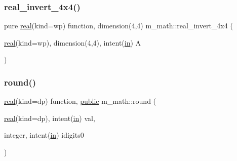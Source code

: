 \subsubsection{\texorpdfstring{real\+\_\+invert\+\_\+4x4()}{real\_invert\_4x4()}}
{\footnotesize\ttfamily pure \hyperlink{read__watch_83_8txt_abdb62bde002f38ef75f810d3a905a823}{real}(kind=wp) function, dimension(4,4) m\+\_\+math\+::real\+\_\+invert\+\_\+4x4 (\begin{DoxyParamCaption}\item[{\hyperlink{read__watch_83_8txt_abdb62bde002f38ef75f810d3a905a823}{real}(kind=wp), dimension(4,4), intent(\hyperlink{M__journal_83_8txt_afce72651d1eed785a2132bee863b2f38}{in})}]{A }\end{DoxyParamCaption})\hspace{0.3cm}{\ttfamily [private]}}

\mbox{\label{namespacem__math_a11ed560b0452d8338ff4958a88cab4de}} 
\subsubsection{\texorpdfstring{round()}{round()}}
{\footnotesize\ttfamily \hyperlink{read__watch_83_8txt_abdb62bde002f38ef75f810d3a905a823}{real}(kind=dp) function, \hyperlink{M__stopwatch_83_8txt_a2f74811300c361e53b430611a7d1769f}{public} m\+\_\+math\+::round (\begin{DoxyParamCaption}\item[{\hyperlink{read__watch_83_8txt_abdb62bde002f38ef75f810d3a905a823}{real}(kind=dp), intent(\hyperlink{M__journal_83_8txt_afce72651d1eed785a2132bee863b2f38}{in})}]{val,  }\item[{integer, intent(\hyperlink{M__journal_83_8txt_afce72651d1eed785a2132bee863b2f38}{in})}]{idigits0 }\end{DoxyParamCaption})}

\mbox{\label{namespacem__math_aa12c4a23dac498e04f8bff1340fc8b30}} 
